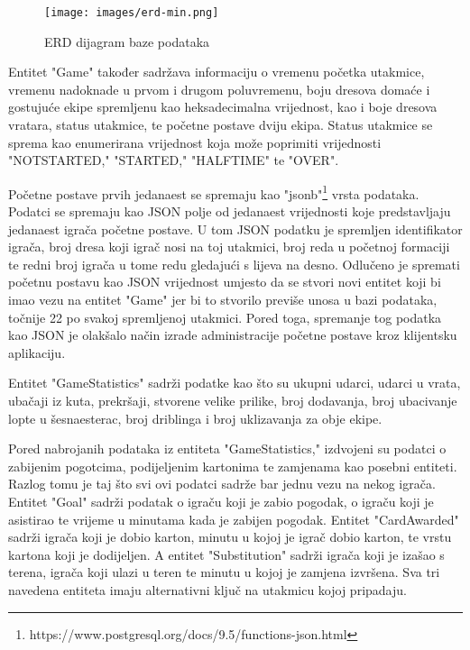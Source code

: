 \documentclass[times, utf8, zavrsni]{fer}
\begin{document}
\begin{figure}[htb]
\centering
\texttt{[image: images/erd-min.png]}
\caption{ERD dijagram baze podataka}
\label{fig:hero}
\end{figure}

Entitet "Game" također sadržava informaciju o vremenu početka utakmice, vremenu nadoknade u prvom i drugom poluvremenu, boju dresova domaće i gostujuće ekipe spremljenu kao heksadecimalna vrijednost,
kao i boje dresova vratara, status utakmice, te početne postave dviju ekipa.
Status utakmice se sprema kao enumerirana vrijednost koja može poprimiti vrijednosti "NOT\textunderscore STARTED," "STARTED," "HALFTIME" te "OVER".

Početne postave prvih jedanaest se spremaju kao "jsonb"\footnote{https://www.postgresql.org/docs/9.5/functions-json.html} \citep{postgressjson} vrsta podataka.
Podatci se spremaju kao JSON polje od jedanaest vrijednosti koje predstavljaju jedanaest igrača početne postave.
U tom JSON podatku je spremljen identifikator igrača, broj dresa koji igrač nosi na toj utakmici, broj reda u početnoj formaciji te redni broj igrača u tome redu gledajući s lijeva na desno.
Odlučeno je spremati početnu postavu kao JSON vrijednost umjesto da se stvori novi entitet koji bi imao vezu na entitet "Game" jer bi to stvorilo previše unosa u bazi podataka, točnije 22 po svakoj spremljenoj utakmici.
Pored toga, spremanje tog podatka kao JSON je olakšalo način izrade administracije početne postave kroz klijentsku aplikaciju.

Entitet "GameStatistics" sadrži podatke kao što su ukupni udarci, udarci u vrata, ubačaji iz kuta, prekršaji, stvorene velike prilike, broj dodavanja, broj ubacivanje lopte u šesnaesterac, broj driblinga i broj uklizavanja za obje ekipe.

Pored nabrojanih podataka iz entiteta "GameStatistics," izdvojeni su podatci o zabijenim pogotcima, podijeljenim kartonima te zamjenama kao posebni entiteti.
Razlog tomu je taj što svi ovi podatci sadrže bar jednu vezu na nekog igrača.
Entitet "Goal" sadrži podatak o igraču koji je zabio pogodak, o igraču koji je asistirao te vrijeme u minutama kada je zabijen pogodak.
Entitet "CardAwarded" sadrži igrača koji je dobio karton, minutu u kojoj je igrač dobio karton, te vrstu kartona koji je dodijeljen.
A entitet "Substitution" sadrži igrača koji je izašao s terena, igrača koji ulazi u teren te minutu u kojoj je zamjena izvršena.
Sva tri navedena entiteta imaju alternativni ključ na utakmicu kojoj pripadaju.
\end{document}
